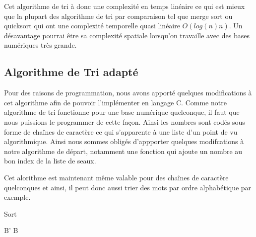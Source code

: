 \documentclass{article}
\begin{document}
Cet algorithme de tri à donc une complexité en temps linéaire ce qui est mieux que la plupart des algorithme de tri par comparaison tel que merge sort ou quicksort qui ont une complexité temporelle quasi linéaire $O(log(n)n)$. Un désavantage pourrai être sa complexité spatiale lorsqu'on travaille avec des bases numériques très grande.

\newpage
\subsection{Algorithme de Tri adapté}

Pour des raisons de programmation, nous avons apporté quelques modifications à cet algorithme afin de pouvoir l'implémenter en langage C. Comme notre algorithme de tri fonctionne pour une base numérique quelconque, il faut que nous puissions le programmer de cette façon. Ainsi les nombres sont codés sous forme de chaînes de caractère ce qui s'apparente à une liste d'un point de vu algorithmique. Ainsi nous sommes obligés d'appporter quelques modifcations à notre algorithme de départ, notamment une fonction qui ajoute un nombre au bon index de la liste de seaux.
\newline

Cet alorithme est maintenant même valable pour des chaînes de caractère quelconques et ainsi, il peut donc aussi trier des mots par ordre alphabétique par exemple.

\begin{algorithm}[]
\caption{Sort}\label{alg:two}
B' \gets B\\
\end{algorithm}
\end{document}
